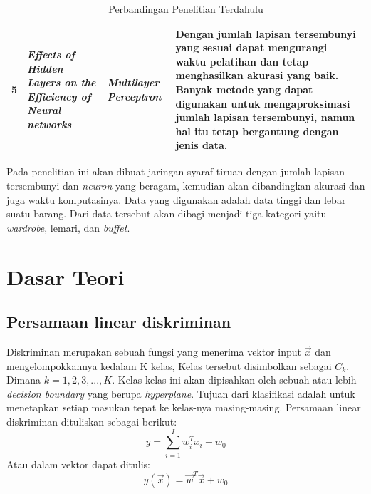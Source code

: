 \begin{table}[H]
    \centering
    \begin{tabular}{| p{0.5cm} | p{10em} | p{5em} | p{10em} |} 
    \hline
    5 & \textit{Effects of Hidden Layers on the Efficiency of Neural networks} & \textit{Multilayer Perceptron} & Dengan jumlah lapisan tersembunyi yang sesuai dapat mengurangi waktu pelatihan dan tetap menghasilkan akurasi yang baik. Banyak metode yang dapat digunakan untuk mengaproksimasi jumlah lapisan tersembunyi, namun hal itu tetap bergantung dengan jenis data. \\ [1ex] 
    \hline
    \end{tabular}
    \caption{Perbandingan Penelitian Terdahulu}
    \label{tab: Perbandingan Penelitian}
\end{table}
Pada penelitian ini akan dibuat jaringan syaraf tiruan dengan jumlah lapisan tersembunyi dan \textit{neuron} yang beragam, kemudian akan dibandingkan akurasi dan juga waktu komputasinya. Data yang digunakan adalah data tinggi dan lebar suatu barang. Dari data tersebut akan dibagi menjadi tiga kategori yaitu \textit{wardrobe}, lemari, dan \textit{buffet}.


\section{Dasar Teori}

\subsection{Persamaan linear diskriminan}

Diskriminan merupakan sebuah fungsi yang menerima vektor input $\vec{x}$ dan mengelompokkannya kedalam K kelas, Kelas tersebut disimbolkan sebagai $C_k$. Dimana $k = 1, 2, 3,...,K$. Kelas-kelas ini akan dipisahkan oleh sebuah atau lebih \textit{decision boundary} yang berupa \textit{hyperplane}\cite{bishop_2006}. Tujuan dari klasifikasi adalah untuk menetapkan setiap masukan tepat ke kelas-nya masing-masing. Persamaan linear diskriminan dituliskan sebagai berikut:
\begin{equation}
    y = \sum_{i=1}^{I} w_i^T x_i + w_0
    \label{eq:wx+b}
\end{equation}
Atau dalam vektor dapat ditulis:
\begin{equation}
    y(\vec{x}) = \vec{w}^T \vec{x} + w_0
    \label{eq:wx+b Vektor}
\end{equation}

